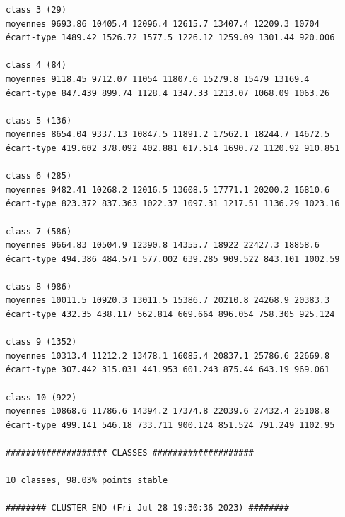 \documentclass[land,article,submit,pdftex,moreauthors]{Definitions/mdpi}
\begin{document}
\begin{scriptsize}
\begin{verbatim}
class 3 (29)
moyennes 9693.86 10405.4 12096.4 12615.7 13407.4 12209.3 10704
écart-type 1489.42 1526.72 1577.5 1226.12 1259.09 1301.44 920.006

class 4 (84)
moyennes 9118.45 9712.07 11054 11807.6 15279.8 15479 13169.4
écart-type 847.439 899.74 1128.4 1347.33 1213.07 1068.09 1063.26

class 5 (136)
moyennes 8654.04 9337.13 10847.5 11891.2 17562.1 18244.7 14672.5
écart-type 419.602 378.092 402.881 617.514 1690.72 1120.92 910.851

class 6 (285)
moyennes 9482.41 10268.2 12016.5 13608.5 17771.1 20200.2 16810.6
écart-type 823.372 837.363 1022.37 1097.31 1217.51 1136.29 1023.16

class 7 (586)
moyennes 9664.83 10504.9 12390.8 14355.7 18922 22427.3 18858.6
écart-type 494.386 484.571 577.002 639.285 909.522 843.101 1002.59

class 8 (986)
moyennes 10011.5 10920.3 13011.5 15386.7 20210.8 24268.9 20383.3
écart-type 432.35 438.117 562.814 669.664 896.054 758.305 925.124

class 9 (1352)
moyennes 10313.4 11212.2 13478.1 16085.4 20837.1 25786.6 22669.8
écart-type 307.442 315.031 441.953 601.243 875.44 643.19 969.061

class 10 (922)
moyennes 10868.6 11786.6 14394.2 17374.8 22039.6 27432.4 25108.8
écart-type 499.141 546.18 733.711 900.124 851.524 791.249 1102.95

#################### CLASSES ####################

10 classes, 98.03% points stable

######## CLUSTER END (Fri Jul 28 19:30:36 2023) ########

\end{verbatim}
\end{scriptsize}
\end{document}
